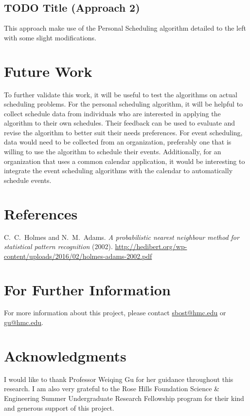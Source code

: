 \documentclass[thesis]{hmcposter}
\begin{document}
\begin{poster}
\subsection{TODO Title (Approach 2)}
This approach make use of the Personal Scheduling algorithm detailed to the left with some slight modifications.

\section{Future Work}
To further validate this work, it will be useful to test the algorithms on actual scheduling problems.
For the personal scheduling algorithm, it will be helpful to collect schedule data from individuals who are interested in applying the algorithm to their own schedules. Their feedback can be used to evaluate and revise the algorithm to better suit their needs preferences.
For event scheduling, data would need to be collected from an organization, preferably one that is willing to use the algorithm to schedule their events.
Additionally, for an organization that uses a common calendar application, it would be interesting to integrate the event scheduling algorithms with the calendar to automatically schedule events.



\section{References}

%
C.~C.~Holmes and N.~M.~Adams. \emph{A probabilistic nearest neighbour method for statistical pattern recognition} (2002). \url{http://hedibert.org/wp-content/uploads/2016/02/holmes-adams-2002.pdf}


\section{For Further Information}
For more information about this project, please contact \url{sbost@hmc.edu} or \url{gu@hmc.edu}.


\section{Acknowledgments}
I would like to thank Professor Weiqing Gu for her guidance throughout this research.
I am also very grateful to the Rose	Hills	Foundation Science \& Engineering Summer Undergraduate Research Fellowship program for their kind and generous support of this project.


\end{poster}
\end{document}
